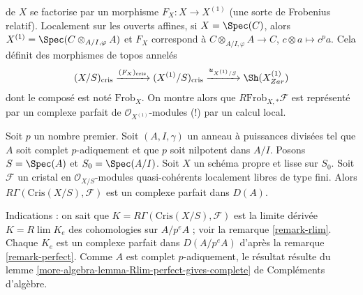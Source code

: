 \begin{remark}
de $X$ se factorise par un morphisme $F_X : X \to X^{(1)}$ (une sorte de
Frobenius relatif). Localement sur les ouverts affines, si $X = \Spec(C)$, alors
$X^{(1)} = \Spec( C \otimes_{A/I, \varphi} A)$
et $F_X$ correspond à $C \otimes_{A/I, \varphi} A \to C$,
$c \otimes a \mapsto c^pa$. Cela définit des morphismes de topos annelés
$$
(X/S)_{\text{cris}}
\xrightarrow{(F_X)_{\text{cris}}}
(X^{(1)}/S)_{\text{cris}}
\xrightarrow{u_{X^{(1)}/S}}
\Sh(X^{(1)}_{Zar})
$$
dont le composé est noté $\text{Frob}_X$. On montre alors que
$R\text{Frob}_{X, *}\mathcal{F}$ est représenté par un
complexe parfait de $\mathcal{O}_{X^{(1)}}$-modules (!)
par un calcul local.
\end{remark}

\begin{remark}
\label{remark-complete-perfect}
Soit $p$ un nombre premier. Soit $(A, I, \gamma)$ un anneau à puissances
divisées tel que $A$ soit complet $p$-adiquement et que $p$ soit nilpotent dans $A/I$. Posons
$S = \Spec(A)$ et $S_0 = \Spec(A/I)$. Soit $X$ un schéma propre
et lisse sur $S_0$. Soit $\mathcal{F}$ un cristal en
$\mathcal{O}_{X/S}$-modules quasi-cohérents localement libres de type fini.
Alors $R\Gamma(\text{Cris}(X/S), \mathcal{F})$ est un
complexe parfait dans $D(A)$.

\medskip\noindent
Indications : on sait que $K = R\Gamma(\text{Cris}(X/S), \mathcal{F})$
est la limite dérivée $K = R\lim K_e$ des cohomologies sur $A/p^eA$ ;
voir la remarque \ref{remark-rlim}.
Chaque $K_e$ est un complexe parfait dans $D(A/p^eA)$ d'après la
remarque \ref{remark-perfect}.
Comme $A$ est complet $p$-adiquement, le résultat
résulte du
lemme \ref{more-algebra-lemma-Rlim-perfect-gives-complete} de Compléments d'algèbre.
\end{remark}

